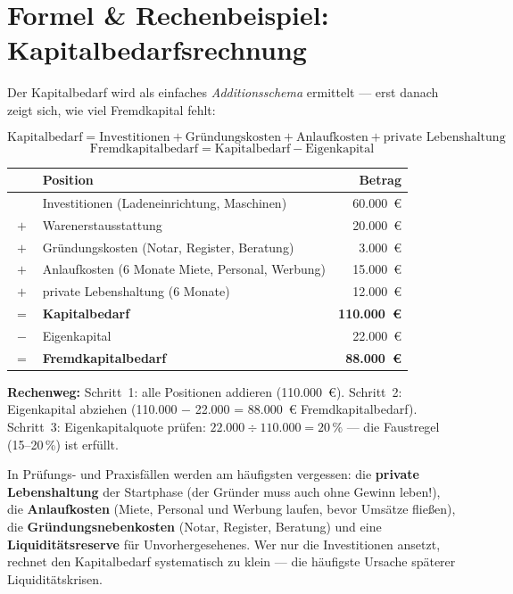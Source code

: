 \documentclass[11pt, a4paper]{article}
\begin{document}
\section{Formel \& Rechenbeispiel: Kapitalbedarfsrechnung}

Der Kapitalbedarf wird als einfaches \emph{Additionsschema} ermittelt --- erst danach
zeigt sich, wie viel Fremdkapital fehlt:

\[
\textrm{Kapitalbedarf} = \textrm{Investitionen} + \textrm{Gründungskosten}
+ \textrm{Anlaufkosten} + \textrm{private Lebenshaltung}
\]
\[
\textrm{Fremdkapitalbedarf} = \textrm{Kapitalbedarf} - \textrm{Eigenkapital}
\]

\begin{beispiel}[title={\bfseries Zahlenbeispiel: Kapitalbedarf einer Ladengründung}]
\begin{center}
\begin{tabular}{clr}
\toprule
 & \textbf{Position} & \textbf{Betrag}\\
\midrule
 & Investitionen (Ladeneinrichtung, Maschinen) & 60.000~€\\
$+$ & Warenerstausstattung & 20.000~€\\
$+$ & Gründungskosten (Notar, Register, Beratung) & 3.000~€\\
$+$ & Anlaufkosten (6 Monate Miete, Personal, Werbung) & 15.000~€\\
$+$ & private Lebenshaltung (6 Monate) & 12.000~€\\
\midrule
$=$ & \textbf{Kapitalbedarf} & \textbf{110.000~€}\\
$-$ & Eigenkapital & 22.000~€\\
\midrule
$=$ & \textbf{Fremdkapitalbedarf} & \textbf{88.000~€}\\
\bottomrule
\end{tabular}
\end{center}
\textbf{Rechenweg:} Schritt~1: alle Positionen addieren (110.000~€).
Schritt~2: Eigenkapital abziehen (110.000 $-$ 22.000 = 88.000~€ Fremdkapitalbedarf).
Schritt~3: Eigenkapitalquote prüfen: $22.000 \div 110.000 = 20\,\%$ ---
die Faustregel (15--20\,\%) ist erfüllt.
\end{beispiel}

\begin{achtung}[title={\bfseries Typische Fehler in der Kapitalbedarfsrechnung}]
In Prüfungs- und Praxisfällen werden am häufigsten vergessen: die \textbf{private
Lebenshaltung} der Startphase (der Gründer muss auch ohne Gewinn leben!), die
\textbf{Anlaufkosten} (Miete, Personal und Werbung laufen, bevor Umsätze fließen), die
\textbf{Gründungsnebenkosten} (Notar, Register, Beratung) und eine
\textbf{Liquiditätsreserve} für Unvorhergesehenes. Wer nur die Investitionen ansetzt,
rechnet den Kapitalbedarf systematisch zu klein --- die häufigste Ursache späterer
Liquiditätskrisen.
\end{achtung}
\end{document}
